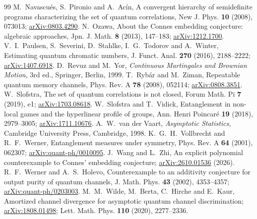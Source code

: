 \documentclass[11pt]{article}
\theoremstyle{definition}
\theoremstyle{remark}
\begin{document}
\begin{thebibliography}{99}
 M.~Navascu\'es, S.~Pironio and A.~Ac\'in, A convergent hierarchy of semidefinite programs characterizing the set of quantum correlations, New J. Phys. \textbf{10} (2008), 073013; \href{https://arxiv.org/abs/0803.4290}{arXiv:0803.4290}.
 N.~Ozawa, About the Connes embedding conjecture: algebraic approaches, Jpn. J. Math. \textbf{8} (2013), 147--183; \href{https://arxiv.org/abs/1212.1700}{arXiv:1212.1700}.
 V.~I.~Paulsen, S.~Severini, D.~Stahlke, I.~G.~Todorov and A.~Winter, Estimating quantum chromatic numbers, J. Funct. Anal. \textbf{270} (2016), 2188--2222; \href{https://arxiv.org/abs/1407.6918}{arXiv:1407.6918}.
 D.~Revuz and M.~Yor, \emph{Continuous Martingales and Brownian Motion}, 3rd ed., Springer, Berlin, 1999.
 T.~Ryb\'ar and M.~Ziman, Repeatable quantum memory channels, Phys. Rev. A \textbf{78} (2008), 052114; \href{https://arxiv.org/abs/0808.3851}{arXiv:0808.3851}.
 W.~Slofstra, The set of quantum correlations is not closed, Forum Math. Pi \textbf{7} (2019), e1; \href{https://arxiv.org/abs/1703.08618}{arXiv:1703.08618}.
 W.~Slofstra and T.~Vidick, Entanglement in non-local games and the hyperlinear profile of groups, Ann. Henri Poincar\'e \textbf{19} (2018), 2979--3005; \href{https://arxiv.org/abs/1711.10676}{arXiv:1711.10676}.
 A.~W.~van der Vaart, \emph{Asymptotic Statistics}, Cambridge University Press, Cambridge, 1998.
 K.~G.~H.~Vollbrecht and R.~F.~Werner, Entanglement measures under symmetry, Phys. Rev. A \textbf{64} (2001), 062307; \href{https://arxiv.org/abs/quant-ph/0010095}{arXiv:quant-ph/0010095}.
 J.~Wang and L.~Zhi, An explicit polynomial counterexample to Connes' embedding conjecture; \href{https://arxiv.org/abs/2610.01536}{arXiv:2610.01536} (2026).
 R.~F.~Werner and A.~S.~Holevo, Counterexample to an additivity conjecture for output purity of quantum channels, J. Math. Phys. \textbf{43} (2002), 4353--4357; \href{https://arxiv.org/abs/quant-ph/0203003}{arXiv:quant-ph/0203003}.
 M.~M.~Wilde, M.~Berta, C.~Hirche and E.~Kaur, Amortized channel divergence for asymptotic quantum channel discrimination; \href{https://arxiv.org/abs/1808.01498}{arXiv:1808.01498}; Lett. Math. Phys. \textbf{110} (2020), 2277--2336.
\end{thebibliography}
\end{document}
